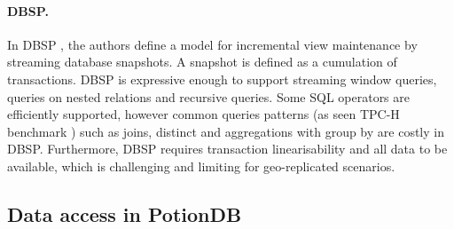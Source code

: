 
\paragraph{DBSP.} In DBSP \cite{dbsp}, the authors define a model for incremental view maintenance by streaming database snapshots.
A snapshot is defined as a cumulation of transactions.
DBSP is expressive enough to support streaming window queries, queries on nested relations and recursive queries.
Some SQL operators are efficiently supported, however common queries patterns (as seen TPC-H benchmark \cite{tpch}) such as joins, distinct and aggregations with group by are costly in DBSP.
Furthermore, DBSP requires transaction linearisability and all data to be available, which is challenging and limiting for geo-replicated scenarios.

\subsection{Data access in PotionDB}


